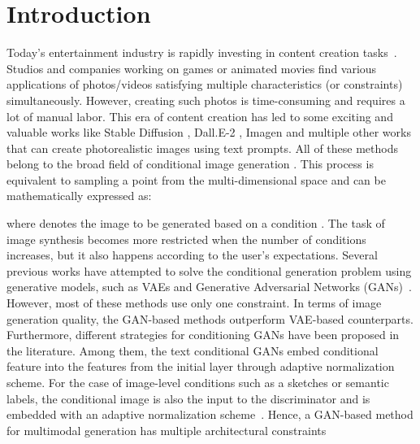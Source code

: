 \documentclass[10pt,twocolumn,letterpaper]{article}
\begin{document}
\vspace{-2mm}
\section{Introduction}
Today's entertainment industry is rapidly investing
in content creation tasks~\cite{park2019SPADE,huang2022multimodal}. Studios and companies working on games or animated movies find various applications of photos/videos satisfying multiple characteristics (or constraints) simultaneously. However, creating such photos is time-consuming and requires a lot of manual labor.
This era of content creation has led to some exciting and valuable works like Stable Diffusion \cite{rombach2022high}, Dall.E-2 \cite{ramesh2022hierarchical}, Imagen \cite{saharia2022photorealistic} and multiple other works that can create photorealistic images using text prompts. All of these methods belong to the broad field of conditional image generation \cite{sohl2015deep,radford2015unsupervised}. 
This process is equivalent to sampling a point from the  multi-dimensional space  and can be mathematically expressed as:
\setlength{\belowdisplayskip}{0pt} \setlength{\belowdisplayshortskip}{0pt}
\setlength{\abovedisplayskip}{0pt} \setlength{\abovedisplayshortskip}{0pt}

where  denotes the image to be generated based on a condition . 
The task of image synthesis becomes more restricted when the number of conditions increases, but it also happens according to the user's expectations. Several previous works have attempted to solve the conditional generation problem using generative models, such as VAEs \cite{kingma2013auto,radford2015unsupervised} and Generative Adversarial Networks (GANs)~\cite{goodfellow2020generative,sohn2015learning}. However, most of these methods use only one constraint.
In terms of image generation quality, the GAN-based methods outperform VAE-based counterparts. Furthermore, different strategies for conditioning GANs have been proposed in the literature. Among them, the text conditional GANs \cite{tang2021attentiongan,ramesh2021zero, chen2020dmgan,xia2021tedigan} embed conditional feature into the features from the initial layer through adaptive normalization scheme. For the case of image-level conditions such as a sketches or semantic labels, the conditional image is also the input to the discriminator and is embedded with an adaptive normalization scheme~\cite{park2019SPADE,tan2021diverse,wang2018pix2pixHD,oasis}. Hence, a GAN-based method for multimodal generation has multiple architectural constraints \cite{huang2021multimodal}
\end{document}
